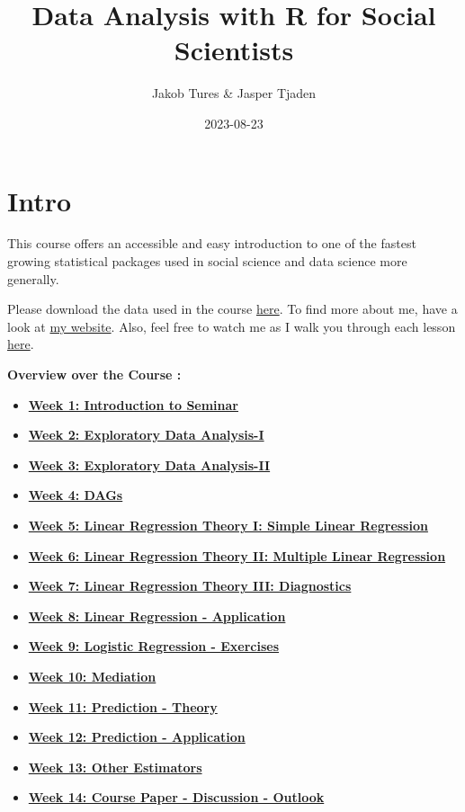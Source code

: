 \documentclass[
]{book}
\title{Data Analysis with R for Social Scientists}
\author{Jakob Tures \& Jasper Tjaden}
\date{2023-08-23}
\providecommand{\tightlist}{%
  \setlength{\itemsep}{0pt}\setlength{\parskip}{0pt}}
\begin{document}
\maketitle

{
\setcounter{tocdepth}{1}
\tableofcontents
}
\hypertarget{intro}{%
\chapter*{Intro}\label{intro}}

This course offers an accessible and easy introduction to one of the fastest growing statistical packages used in social science and data science more generally.

Please download the data used in the course \href{https://www.worldvaluessurvey.org/WVSDocumentationWV7.jsp}{here}. To find more about me, have a look at \href{https://jaspertjaden.com}{my website}. Also, feel free to watch me as I walk you through each lesson \href{https://www.youtube.com/playlist?list=PLr43hk2e3hFMg4tZdJsN0qzG5YkQB3A1c}{here}.

\textbf{Overview over the Course :}

\begin{itemize}
\tightlist
\item
  \textbf{\protect\hyperlink{intro-sem}{Week 1: Introduction to Seminar}}
\item
  \textbf{\protect\hyperlink{eda-1}{Week 2: Exploratory Data Analysis-I}}
\item
  \textbf{\protect\hyperlink{eda-2}{Week 3: Exploratory Data Analysis-II}}
\item
  \textbf{\protect\hyperlink{dags-1}{Week 4: DAGs}}
\item
  \textbf{\protect\hyperlink{lin-t-1}{Week 5: Linear Regression Theory I: Simple Linear Regression}}
\item
  \textbf{\protect\hyperlink{lin-t-2}{Week 6: Linear Regression Theory II: Multiple Linear Regression}}
\item
  \textbf{\protect\hyperlink{lin-t-3}{Week 7: Linear Regression Theory III: Diagnostics}}
\item
  \textbf{\protect\hyperlink{lin-a}{Week 8: Linear Regression - Application}}
\item
  \textbf{\protect\hyperlink{lin-e}{Week 9: Logistic Regression - Exercises}}
\item
  \textbf{\protect\hyperlink{med}{Week 10: Mediation}}
\item
  \textbf{\protect\hyperlink{pm-t}{Week 11: Prediction - Theory}}
\item
  \textbf{\protect\hyperlink{pm-a}{Week 12: Prediction - Application}}
\item
  \textbf{\protect\hyperlink{other-est}{Week 13: Other Estimators}}
\item
  \textbf{\protect\hyperlink{out-look}{Week 14: Course Paper - Discussion - Outlook}}
\end{itemize}
\end{document}
